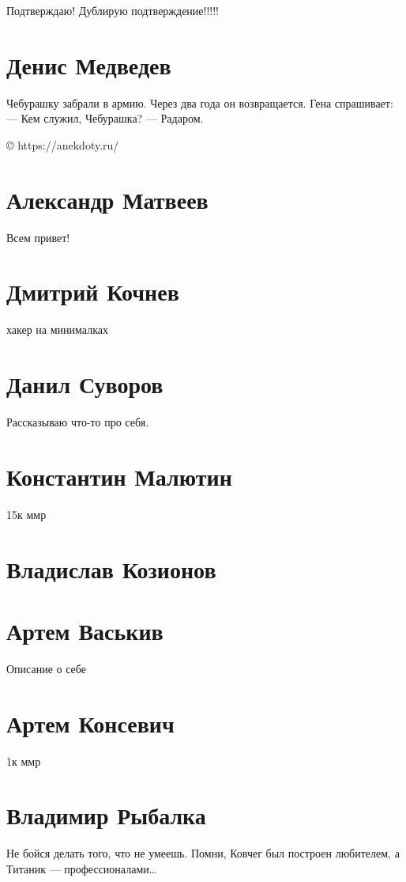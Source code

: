 \documentclass{article}
\begin{document}
Подтверждаю! Дублирую подтверждение!!!!!

\section*{Денис Медведев}

Чебурашку забрали в армию. Через два года он возвращается. Гена спрашивает:
— Кем служил, Чебурашка?
— Радаром.

© https://anekdoty.ru/
\section*{Александр Матвеев}

Всем привет!


\section*{Дмитрий Кочнев}
хакер на минималках
\section*{Данил Суворов}
Рассказываю что-то про себя.
\section*{Константин Малютин}
 15к ммр
\section*{Владислав Козионов}

\section*{Артем Васькив}
Описание о себе
\section*{Артем Консевич}
1к ммр
\section*{Владимир Рыбалка}
Не бойся делать того, что не умеешь. Помни, Ковчег был построен любителем, а Титаник — профессионалами…
\end{document}
